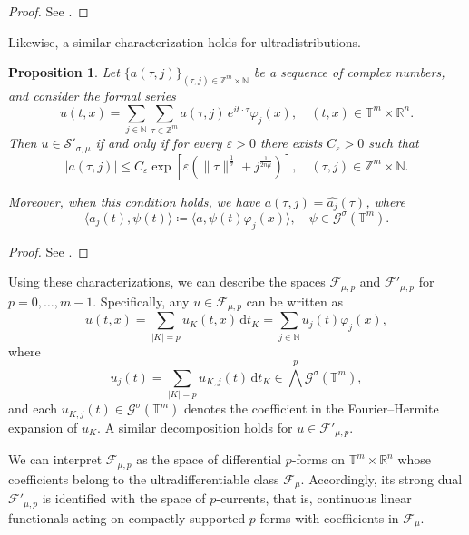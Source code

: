 \documentclass[12pt,reqno]{amsart}
\newtheorem{proposition}[theorem]{Proposition}
\theoremstyle{definition}
\numberwithin{equation}{section}
\begin{document}
\begin{proof}
	See \cite[Theorem 2.4]{AviCapKir25}.
\end{proof}

Likewise, a similar characterization holds for ultradistributions.

\begin{proposition}\label{charac_full_fourier_ultradistr}
	Let $\{a(\tau,j)\}_{(\tau,j) \in \mathbb{Z}^m \times \mathbb{N}}$ be a sequence of complex numbers, and consider the formal series
	\[
	u(t,x) = \sum_{j \in \mathbb{N}} \sum_{\tau \in \mathbb{Z}^m} a(\tau,j) \, e^{i t \cdot \tau} \varphi_j(x), \quad (t,x)\in\mathbb{T}^m\times\mathbb{R}^n.
	\]
	Then $u \in \mathcal{S}'_{\sigma,\mu}$ if and only if for every $\varepsilon > 0$ there exists $C_\varepsilon > 0$ such that
	\begin{equation}\label{seq-full-coeff-distr}
		|a(\tau,j)| \leq C_\varepsilon 
		\exp\left[\varepsilon \left(\|\tau\|^{\frac{1}{\sigma}} + j^{\frac{1}{2n\mu}}\right)\right], \quad  (\tau,j) \in \mathbb{Z}^m \times \mathbb{N}.
	\end{equation}
	
	Moreover, when this condition holds, we have $a(\tau,j) = \widehat{a_j}(\tau)$, where
	\[
	\langle a_j(t), \psi(t) \rangle \coloneqq \langle a, \psi(t) \varphi_j(x) \rangle, \quad \psi \in \mathcal{G}^\sigma(\mathbb{T}^m).
	\]
\end{proposition}

\begin{proof}
	See \cite[Theorem 2.5]{AviCapKir25}.
\end{proof}

Using these characterizations, we can describe the spaces $\mathscr{F}_{\mu,p}$ and $\mathscr{F}'_{\mu,p}$ for $p = 0, \ldots, m - 1$. Specifically, any $u \in \mathscr{F}_{\mu,p}$ can be written as
\[
u(t,x) = \sum_{|K|=p} u_K(t,x) \, \mathrm{d}t_K = \sum_{j \in \mathbb{N}} u_j(t) \varphi_j(x),
\]
where
\[
u_j(t) = \sum_{|K|=p} u_{K,j}(t) \, \mathrm{d}t_K \in \textstyle\bigwedge^p \mathcal{G}^\sigma(\mathbb{T}^m),
\]
and each $u_{K,j}(t) \in \mathcal{G}^\sigma(\mathbb{T}^m)$ denotes the coefficient in the Fourier–Hermite expansion of $u_K$. A similar decomposition holds for $u \in \mathscr{F}'_{\mu,p}$.

We can interpret $\mathscr{F}_{\mu,p}$ as the space of differential $p$-forms on $\mathbb{T}^m \times \mathbb{R}^n$ whose coefficients belong to the ultradifferentiable class $\mathscr{F}_\mu$. Accordingly, its strong dual $\mathscr{F}'_{\mu,p}$ is identified with the space of $p$-currents, that is, continuous linear functionals acting on compactly supported $p$-forms with coefficients in $\mathscr{F}_\mu$.
\end{document}
